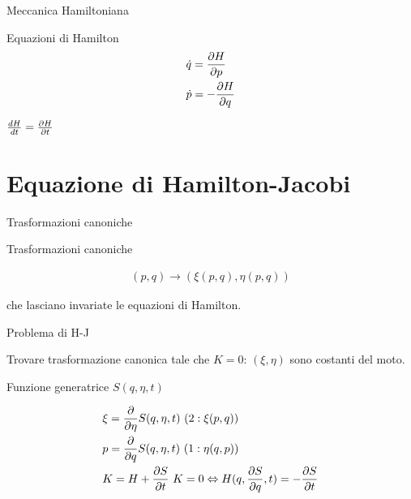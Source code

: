 \begin{wordonframe}{Meccanica Hamiltoniana}

\begin{block}{Equazioni di Hamilton}
\begin{align*}
&\dot{q}=\PDy{p}{H}\\
&\dot{p}=-\PDy{q}{H}
\end{align*}
\end{block}

$\TDy{t}{H}=\PDy{t}{H}$

\end{wordonframe}


\section{Equazione di Hamilton-Jacobi}

\begin{frame}{Trasformazioni canoniche}

\begin{block}{Trasformazioni canoniche}

\begin{align*}
(p,q)\to(\xi(p,q),\eta(p,q))
\end{align*}

che lasciano invariate le equazioni di Hamilton.

\end{block}

\begin{block}{Problema di H-J}

Trovare trasformazione canonica tale che $K=0$: $(\xi,\eta)$ sono costanti del moto.

\end{block}

\begin{block}{Funzione generatrice $S(q,\eta,t)$}

\begin{align*}
&\xi=\PDof{\eta}S(q,\eta,t)\ (2: \xi(p,q))\\
&p=\PDof{q}S(q,\eta,t)\ (1:\eta(q,p))\\
&K=H+\PDy{t}{S}\ K=0\Leftrightarrow H(q,\PDy{q}{S},t)=-\PDy{t}{S}
\end{align*}

\end{block}

\end{frame}


